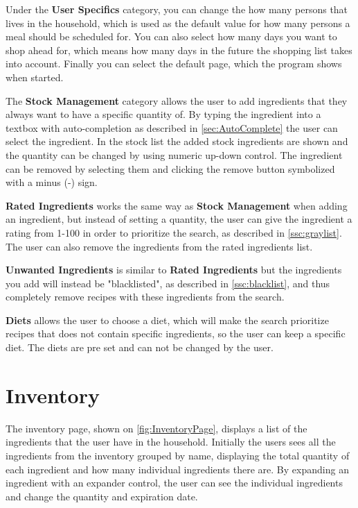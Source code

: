 Under the \textbf{User Specifics} category, you can change the how many persons that lives in the household, which is used as the default value for how many persons a meal should be scheduled for. You can also select how many days you want to shop ahead for, which means how many days in the future the shopping list takes into account. Finally you can select the default page, which the program shows when started.

The \textbf{Stock Management} category allows the user to add ingredients that they always want to have a specific quantity of. By typing the ingredient into a textbox with auto-completion as described in \cref{sec:AutoComplete} the user can select the ingredient. In the stock list the added stock ingredients are shown and the quantity can be changed by using numeric up-down control. The ingredient can be removed by selecting them and clicking the remove button symbolized with a minus (-) sign.

\textbf{Rated Ingredients} works the same way as \textbf{Stock Management} when adding an ingredient, but instead of setting a quantity, the user can give the ingredient a rating from 1-100 in order to prioritize the search, as described in \cref{ssc:graylist}. The user can also remove the ingredients from the rated ingredients list.

\textbf{Unwanted Ingredients} is similar to \textbf{Rated Ingredients} but the ingredients you add will instead be "blacklisted", as described in \cref{ssc:blacklist}, and thus completely remove recipes with these ingredients from the search.

\textbf{Diets} allows the user to choose a diet, which will make the search prioritize recipes that does not contain specific ingredients, so the user can keep a specific diet. The diets are pre set and can not be changed by the user.

\section{Inventory} \label{ss:inventory}
The inventory page, shown on \cref{fig:InventoryPage}, displays a list of the ingredients that the user have in the household. Initially the users sees all the ingredients from the inventory grouped by name, displaying the total quantity of each ingredient and how many individual ingredients there are. By expanding an ingredient with an expander control, the user can see the individual ingredients and change the quantity and expiration date.

